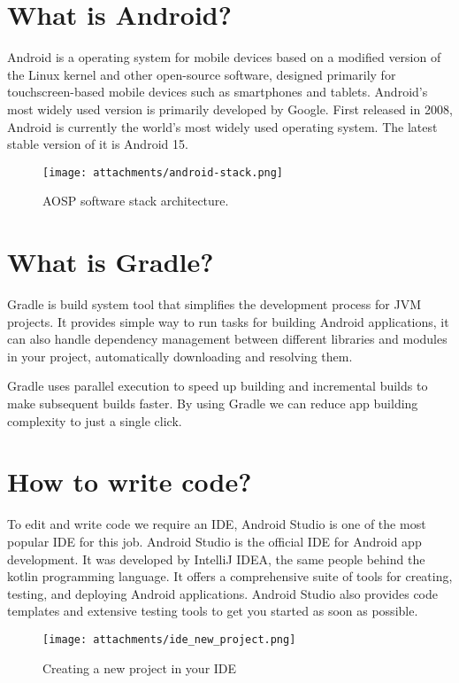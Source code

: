 \documentclass[12pt,oneside]{book}
\begin{document}
\section{What is Android?}
Android is a operating system for mobile devices based on a modified version of the Linux kernel and other open-source software, designed primarily for touchscreen-based mobile devices such as smartphones and tablets. Android's most widely used version is primarily developed by Google. First released in 2008, Android is currently the world's most widely used operating system. The latest stable version of it is Android 15.

\begin{figure}
  \centering
  \texttt{[image: attachments/android-stack.png]}
  \caption{AOSP software stack architecture.}
\end{figure}

\section{What is Gradle?}
Gradle is build system tool that simplifies the development process for JVM projects. It provides simple way to run tasks for building Android applications, it can also handle dependency management between different libraries and modules in your project, automatically downloading and resolving them.

Gradle uses parallel execution to speed up building and incremental builds to make subsequent builds faster. By using Gradle we can reduce app building complexity to just a single click.

\section{How to write code?\label{ide}}
To edit and write code we require an IDE, Android Studio is one of the most popular IDE for this job. Android Studio is the official IDE for Android app development. It was developed by IntelliJ IDEA, the same people behind the kotlin programming language. It offers a comprehensive suite of tools for creating, testing, and deploying Android applications. Android Studio also provides code templates and extensive testing tools to get you started as soon as possible.

\begin{figure}
  \centering
  \texttt{[image: attachments/ide\_new\_project.png]}
  \caption{Creating a new project in your IDE}
\end{figure}
\end{document}
